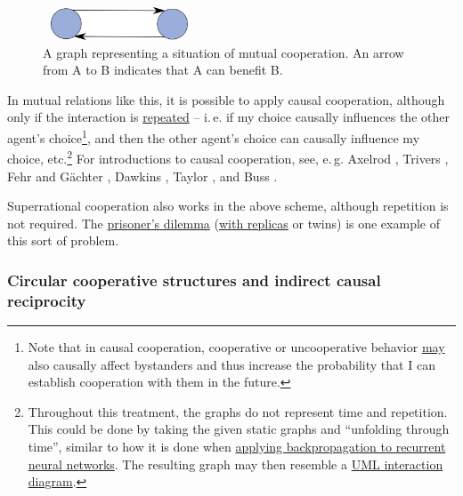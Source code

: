 \begin{figure}
    \centering
    \includegraphics[width=1.78646in,height=0.38583in]{figs/mutual-cooperation-graph}
    \caption{A graph representing a situation of mutual cooperation. An arrow from A to B indicates
    that A can benefit B.}
    \label{mutual-cooperation-graph}
\end{figure}

In mutual relations like this, it is possible to apply causal
cooperation, although only if the interaction is
\href{https://en.wikipedia.org/wiki/Prisoner\%27s_dilemma\#The_iterated_prisoner.27s_dilemma}{repeated}
-- i.\,e. if my choice causally influences the other agent's
choice\footnote{Note that in causal cooperation, cooperative or
  uncooperative behavior
  \href{https://en.wikipedia.org/wiki/Reciprocity_(evolution)\#Indirect_reciprocity}{may}
  also causally affect bystanders and thus increase the probability that
  I can establish cooperation with them in the future.}, and then the
other agent's choice can causally influence my choice, etc.\footnote{Throughout
  this treatment, the graphs do not represent time and repetition. This
  could be done by taking the given static graphs and ``unfolding
  through time'', similar to how it is done when
  \href{https://en.wikipedia.org/wiki/Backpropagation_through_time}{applying
  backpropagation to recurrent neural networks}. The resulting graph
  may then resemble a
  \href{https://en.wikipedia.org/wiki/Unified_Modeling_Language\#Interaction_diagrams}{UML
  interaction diagram}.} For introductions to causal cooperation, see, e.\,g.
  Axelrod \citeyear{Axelrod2006-ci}, Trivers \citeyear{Trivers1971-rb}, Fehr and Gächter
  \citeyear{Fehr1999-pd}, Dawkins \citeyear{Dawkins1976-cd}, Taylor \citeyear{Taylor1987-wn}, and
  Buss \citeyear{Buss2015-kp}.

Superrational cooperation also works in the above scheme, although
repetition is not required. The
\href{https://en.wikipedia.org/wiki/Prisoner\%27s_dilemma}{prisoner's
dilemma}
(\href{http://plato.stanford.edu/entries/prisoner-dilemma/\#PDRepCauDecThe}{with
replicas} or twins) is one example of this sort of problem.

\subsubsection{Circular cooperative structures and indirect causal
reciprocity}\label{circular-cooperative-structures-and-indirect-causal-reciprocity}

